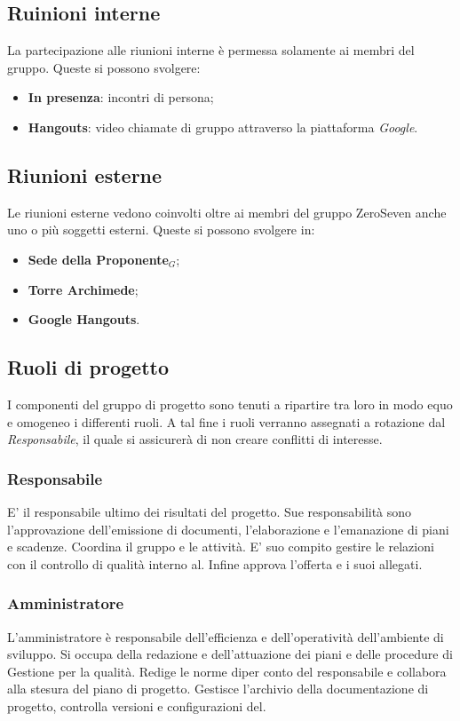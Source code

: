 \subsection{Ruinioni interne}
La partecipazione alle riunioni interne è permessa solamente ai membri del gruppo. Queste si possono svolgere:
\begin{itemize}
	\item \textbf{In presenza}: incontri di persona;
	\item \textbf{Hangouts}: video chiamate di gruppo attraverso la piattaforma \textit{Google}.
\end{itemize}
\subsection{Riunioni esterne}
Le riunioni esterne vedono coinvolti oltre ai membri del gruppo ZeroSeven anche uno o più soggetti esterni. Queste si possono svolgere  in:
\begin{itemize}
	\item \textbf{Sede della Proponente$_{G}$};
	\item \textbf{Torre Archimede};
	\item \textbf{Google Hangouts}.
\end{itemize}
\subsection{Ruoli di progetto}
I componenti del gruppo di progetto sono tenuti a ripartire tra loro in modo equo e omogeneo i differenti ruoli. A tal fine i ruoli verranno assegnati a rotazione dal \textit{Responsabile}, il quale si assicurerà di non creare conflitti di interesse.
\subsubsection{Responsabile}E' il responsabile ultimo dei risultati del progetto. Sue responsabilità sono l'approvazione dell'emissione di documenti, l'elaborazione e l'emanazione di piani e scadenze. Coordina il gruppo e le attività. E' suo compito gestire le relazioni con il controllo di qualità interno al. Infine approva l'offerta e i suoi allegati.
\subsubsection{Amministratore} L'amministratore è responsabile dell'efficienza e dell'operatività dell'ambiente di sviluppo. Si occupa della redazione e dell'attuazione dei piani e delle procedure di Gestione per la qualità. Redige le norme diper conto del responsabile e collabora alla stesura del piano di progetto. Gestisce l'archivio della documentazione di progetto, controlla versioni e configurazioni del.
